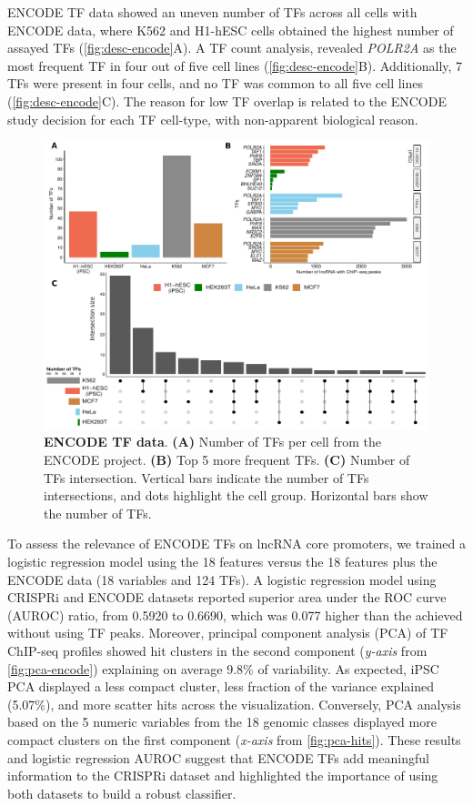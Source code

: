 ENCODE TF data showed an uneven number of TFs across all cells with ENCODE data, where K562 and H1-hESC cells obtained the highest number of assayed TFs (\autoref{fig:desc-encode}A). A TF count analysis, revealed \textit{POLR2A} as the most frequent TF in four out of five cell lines (\autoref{fig:desc-encode}B). Additionally, 7 TFs were present in four cells, and no TF was common to all five cell lines (\autoref{fig:desc-encode}C). The reason for low TF overlap is related to the ENCODE study decision for each TF cell-type, with non-apparent biological reason. 

\begin{figure}[ht!]
  \centering
  \includegraphics[scale=0.7]{plots/results/ml/exp.encode.pdf}
  \caption[ENCODE TF data]{\textbf{ENCODE TF data}. \textbf{(A)} Number of TFs per cell from the ENCODE project. \textbf{(B)} Top 5 more frequent TFs. \textbf{(C)} Number of TFs intersection. Vertical bars indicate the number of TFs intersections, and dots highlight the cell group. Horizontal bars show the number of TFs.}
  \label{fig:desc-encode}
\end{figure}

To assess the relevance of ENCODE TFs on lncRNA core promoters, we trained a logistic regression model using the 18 features\autocite{liu_2017_crispri} versus the 18 features plus the ENCODE data (18 variables and 124 TFs). A logistic regression model using CRISPRi and ENCODE datasets reported superior area under the ROC curve (AUROC) ratio, from 0.5920 to 0.6690, which was 0.077 higher than the achieved without using TF peaks. Moreover, principal component analysis (PCA) of TF ChIP-seq profiles showed hit clusters in the second component (\textit{y-axis} from \autoref{fig:pca-encode}) explaining on average 9.8\% of variability. As expected, iPSC PCA displayed a less compact cluster, less fraction of the variance explained (5.07\%), and more scatter hits across the visualization. Conversely, PCA analysis based on the 5 numeric variables from the 18 genomic classes displayed more compact clusters on the first component (\textit{x-axis} from \autoref{fig:pca-hits}). These results and logistic regression AUROC suggest that ENCODE TFs add meaningful information to the CRISPRi dataset and highlighted the importance of using both datasets to build a robust classifier. 


